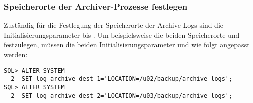         \subsubsection{Speicherorte der Archiver-Prozesse festlegen}
         Zust\"andig f\"ur die Festlegung der Speicherorte der Archive Logs sind die Initialisierungsparameter  bis . Um beispielsweise die beiden Speicherorte  und  festzulegen, m\"ussen die beiden Initialisierungsparameter  und  wie folgt angepasst werden:
          \begin{lstlisting}[caption={log\_archive\_dest-Parameter setzen},label=admin48,language=oracle_sql]
SQL> ALTER SYSTEM
  2  SET log_archive_dest_1='LOCATION=/u02/backup/archive_logs';
SQL> ALTER SYSTEM
  2  SET log_archive_dest_2='LOCATION=/u03/backup/archive_logs';
          \end{lstlisting}
